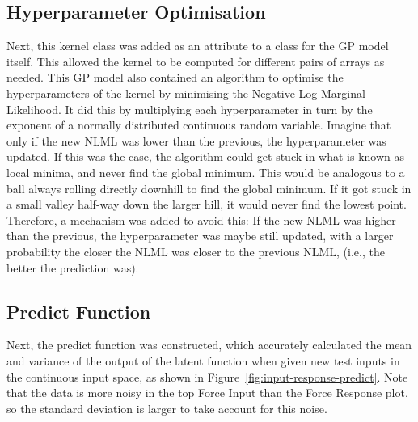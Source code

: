 \documentclass[12pt]{article}
\begin{document}
    \subsection{Hyperparameter Optimisation}
    Next, this kernel class was added as an attribute to a class for the GP model itself.
    This allowed the kernel to be computed for different pairs of arrays as needed.
    This GP model also contained an algorithm to optimise the hyperparameters of the kernel by minimising the Negative Log Marginal Likelihood.
    It did this by multiplying each hyperparameter in turn by the exponent of a normally distributed continuous random variable.
    Imagine that only if the new NLML was lower than the previous, the hyperparameter was updated.
    If this was the case, the algorithm could get stuck in what is known as local minima, and never find the global minimum.
    This would be analogous to a ball always rolling directly downhill to find the global minimum.
    If it got stuck in a small valley half-way down the larger hill, it would never find the lowest point.
    Therefore, a mechanism was added to avoid this:
    If the new NLML was higher than the previous, the hyperparameter was maybe still updated, with a larger probability the closer the NLML was closer to the previous NLML, (i.e., the better the prediction was).

    \subsection{Predict Function}
    Next, the predict function was constructed, which accurately calculated the mean and variance of the output of the latent function when given new test inputs in the continuous input space, as shown in Figure~\ref{fig:input-response-predict}.
    Note that the data is more noisy in the top Force Input than the Force Response plot, so the standard deviation is larger to take account for this noise.
\end{document}
